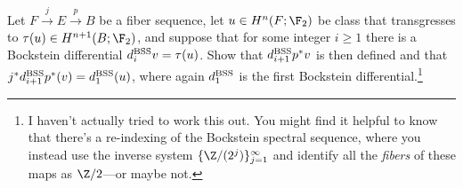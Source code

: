 \begin{problem}
Let $F \xrightarrow{j} E \xrightarrow{p} B$ be a fiber sequence, let $u \in H^n(F; \F_2)$ be class that transgresses to $\tau(u) \in H^{n+1}(B; \F_2)$, and suppose that for some integer $i \ge 1$ there is a Bockstein differential $d^{\mathrm{BSS}}_i v = \tau(u)$.  Show that $d^{\mathrm{BSS}}_{i+1} p^* v$ is then defined and that $j^* d^{\mathrm{BSS}}_{i+1} p^*(v) = d^{\mathrm{BSS}}_1(u)$, where again $d^{\mathrm{BSS}}_1$ is the first Bockstein differential.\footnote{I haven't actually tried to work this out. You might find it helpful to know that there's a re-indexing of the Bockstein spectral sequence, where you instead use the inverse system $\{\Z/(2^j)\}_{j=1}^\infty$ and identify all the \emph{fibers} of these maps as $\Z/2$---or maybe not.}
\end{problem}

